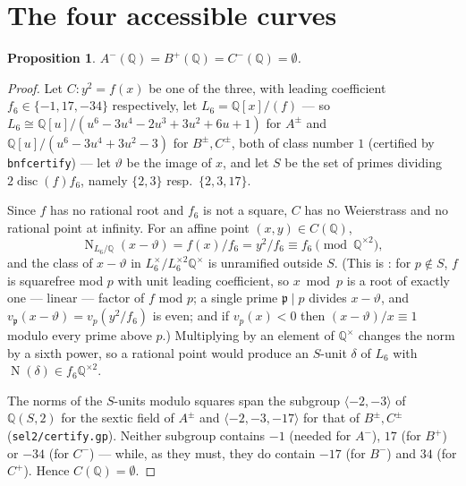 \documentclass[11pt,reqno]{amsart}
\theoremstyle{plain}
\newtheorem{proposition}[theorem]{Proposition}
\theoremstyle{definition}
\newcommand{\Q}{\mathbb{Q}}
\newcommand{\pp}{\mathfrak{p}}
\DeclareMathOperator{\disc}{disc}
\DeclareMathOperator{\Nm}{N}
\numberwithin{equation}{section}
\begin{document}
\section{The four accessible curves}\label{sec:easy}

\begin{proposition}\label{prop:B1}
$A^{-}(\Q)=B^{+}(\Q)=C^{-}(\Q)=\emptyset$.
\end{proposition}

\begin{proof}
Let $C\colon y^{2}=f(x)$ be one of the three, with leading coefficient
$f_{6}\in\{-1,17,-34\}$ respectively, let $L_{6}=\Q[x]/(f)$ --- so
$L_{6}\cong\Q[u]/(u^{6}-3u^{4}-2u^{3}+3u^{2}+6u+1)$ for $A^{\pm}$ and
$\Q[u]/(u^{6}-3u^{4}+3u^{2}-3)$ for $B^{\pm},C^{\pm}$, both of class number $1$
(certified by \texttt{bnfcertify}) --- let $\vartheta$ be the image of $x$, and
let $S$ be the set of primes dividing $2\disc(f)f_{6}$, namely $\{2,3\}$
resp.\ $\{2,3,17\}$.

Since $f$ has no rational root and $f_{6}$ is not a square, $C$ has no
Weierstrass and no rational point at infinity. For an affine point
$(x,y)\in C(\Q)$,
\[
  \Nm_{L_{6}/\Q}(x-\vartheta)=f(x)/f_{6}=y^{2}/f_{6}\equiv f_{6}
  \pmod{\Q^{\times2}},
\]
and the class of $x-\vartheta$ in $L_{6}^{\times}/L_{6}^{\times2}\Q^{\times}$ is
unramified outside $S$. (This is \cite[Lemma 4.3]{BruinStoll}: for $p\notin S$,
$f$ is squarefree mod $p$ with unit leading coefficient, so $x\bmod p$ is a root
of exactly one --- linear --- factor of $f$ mod $p$; a single prime $\pp\mid p$
divides $x-\vartheta$, and $v_{\pp}(x-\vartheta)=v_{p}(y^{2}/f_{6})$ is even;
and if $v_{p}(x)<0$ then $(x-\vartheta)/x\equiv1$ modulo every prime above $p$.)
Multiplying by an element of $\Q^{\times}$ changes the norm by a sixth power, so
a rational point would produce an $S$-unit $\delta$ of $L_{6}$ with
$\Nm(\delta)\in f_{6}\Q^{\times2}$.

The norms of the $S$-units modulo squares span the subgroup
$\langle -2,-3\rangle$ of $\Q(S,2)$ for the sextic field of $A^{\pm}$ and
$\langle -2,-3,-17\rangle$ for that of $B^{\pm},C^{\pm}$
(\texttt{sel2/certify.gp}). Neither subgroup contains $-1$ (needed for
$A^{-}$), $17$ (for $B^{+}$) or $-34$ (for $C^{-}$) --- while, as they must,
they do contain $-17$ (for $B^{-}$) and $34$ (for $C^{+}$). Hence
$C(\Q)=\emptyset$.
\end{proof}
\end{document}
